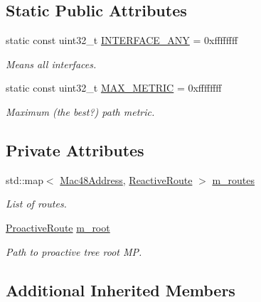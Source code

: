 \subsection*{Static Public Attributes}
\begin{DoxyCompactItemize}
\item 
static const uint32\+\_\+t \hyperlink{classns3_1_1dot11s_1_1HwmpRtable_a2fa1f4fa97e71399696c2e9a8a95b838}{I\+N\+T\+E\+R\+F\+A\+C\+E\+\_\+\+A\+NY} = 0xffffffff
\begin{DoxyCompactList}\small\item\em Means all interfaces. \end{DoxyCompactList}\item 
static const uint32\+\_\+t \hyperlink{classns3_1_1dot11s_1_1HwmpRtable_a3aed0da4da63b8109c4cb4eef396428e}{M\+A\+X\+\_\+\+M\+E\+T\+R\+IC} = 0xffffffff
\begin{DoxyCompactList}\small\item\em Maximum (the best?) path metric. \end{DoxyCompactList}\end{DoxyCompactItemize}
\subsection*{Private Attributes}
\begin{DoxyCompactItemize}
\item 
std\+::map$<$ \hyperlink{classns3_1_1Mac48Address}{Mac48\+Address}, \hyperlink{structns3_1_1dot11s_1_1HwmpRtable_1_1ReactiveRoute}{Reactive\+Route} $>$ \hyperlink{classns3_1_1dot11s_1_1HwmpRtable_a72afac5a0c979b3d4f160786ef865eab}{m\+\_\+routes}
\begin{DoxyCompactList}\small\item\em List of routes. \end{DoxyCompactList}\item 
\hyperlink{structns3_1_1dot11s_1_1HwmpRtable_1_1ProactiveRoute}{Proactive\+Route} \hyperlink{classns3_1_1dot11s_1_1HwmpRtable_ac0dfb00c0c51b00ea3d5d78d0fbc5cd7}{m\+\_\+root}
\begin{DoxyCompactList}\small\item\em Path to proactive tree root MP. \end{DoxyCompactList}\end{DoxyCompactItemize}
\subsection*{Additional Inherited Members}


